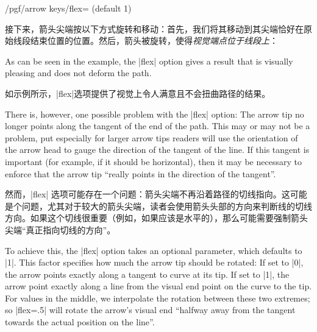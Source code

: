 \begin{key}{/pgf/arrow keys/flex= (default 1)}
\begin{enumerate}
            接下来，箭头尖端按以下方式旋转和移动：首先，我们将其移动到其尖端恰好在原始线段结束位置的位置。然后，箭头被旋转，使得\emph{视觉端点位于线段上}：


\begin{codeexample}[preamble={\usetikzlibrary{arrows.meta,bending}}]
\end{codeexample}
    \end{enumerate}

    As can be seen in the example, the |flex| option gives a result that is
    visually pleasing and does not deform the path.

    如示例所示，|flex|选项提供了视觉上令人满意且不会扭曲路径的结果。

    There is, however, one possible problem with the |flex| option: The arrow
    tip no longer points along the tangent of the end of the path. This may or
    may not be a problem, put especially for larger arrow tips readers will use
    the orientation of the arrow head to gauge the direction of the tangent of
    the line. If this tangent is important (for example, if it should be
    horizontal), then it may be necessary to enforce that the arrow tip
    ``really points in the direction of the tangent''.

    然而，|flex| 选项可能存在一个问题：箭头尖端不再沿着路径的切线指向。这可能是个问题，尤其对于较大的箭头尖端，读者会使用箭头头部的方向来判断线的切线方向。如果这个切线很重要（例如，如果应该是水平的），那么可能需要强制箭头尖端“真正指向切线的方向”。

    To achieve this, the |flex| option takes an optional 
    parameter, which defaults to |1|. This factor specifies how much the arrow
    tip should be rotated: If set to |0|, the arrow points exactly along a
    tangent to curve at its tip. If set to |1|, the arrow point exactly along a
    line from the visual end point on the curve to the tip. For values in the
    middle, we interpolate the rotation between these two extremes; so
    |flex=.5| will rotate the arrow's visual end ``halfway away from the
    tangent towards the actual position on the line''.
    

\end{key}

